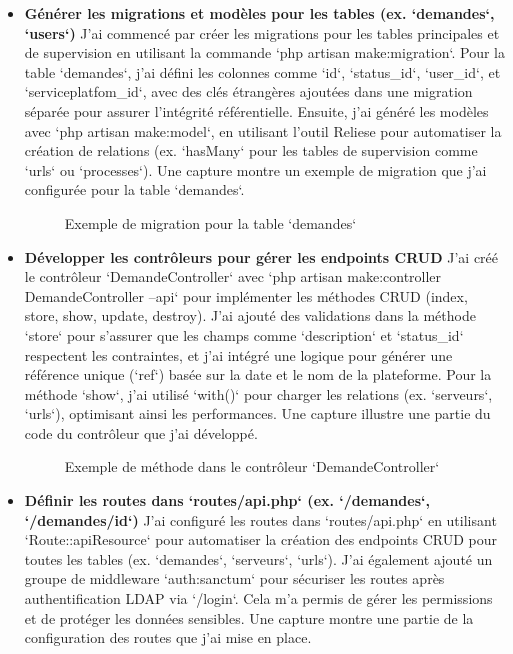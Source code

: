 \begin{itemize}
    \item \textbf{Générer les migrations et modèles pour les tables (ex. `demandes`, `users`)}  
      J’ai commencé par créer les migrations pour les tables principales et de supervision en utilisant la commande `php artisan make:migration`. Pour la table `demandes`, j’ai défini les colonnes comme `id`, `status\_id`, `user\_id`, et `serviceplatfom\_id`, avec des clés étrangères ajoutées dans une migration séparée pour assurer l’intégrité référentielle. Ensuite, j’ai généré les modèles avec `php artisan make:model`, en utilisant l’outil Reliese pour automatiser la création de relations (ex. `hasMany` pour les tables de supervision comme `urls` ou `processes`). Une capture montre un exemple de migration que j’ai configurée pour la table `demandes`.
      
      \begin{figure}[h]
          \centering
          \caption{Exemple de migration pour la table `demandes`}
          \label{fig:migration_demandes}
      \end{figure}
      
    \item \textbf{Développer les contrôleurs pour gérer les endpoints CRUD}  
      J’ai créé le contrôleur `DemandeController` avec `php artisan make:controller DemandeController --api` pour implémenter les méthodes CRUD (index, store, show, update, destroy). J’ai ajouté des validations dans la méthode `store` pour s’assurer que les champs comme `description` et `status\_id` respectent les contraintes, et j’ai intégré une logique pour générer une référence unique (`ref`) basée sur la date et le nom de la plateforme. Pour la méthode `show`, j’ai utilisé `with()` pour charger les relations (ex. `serveurs`, `urls`), optimisant ainsi les performances. Une capture illustre une partie du code du contrôleur que j’ai développé.
      
      \begin{figure}[h]
          \centering
          \caption{Exemple de méthode dans le contrôleur `DemandeController`}
          \label{fig:controller_demandes}
      \end{figure}
      
    \item \textbf{Définir les routes dans `routes/api.php` (ex. `/demandes`, `/demandes/{id}`)}  
      J’ai configuré les routes dans `routes/api.php` en utilisant `Route::apiResource` pour automatiser la création des endpoints CRUD pour toutes les tables (ex. `demandes`, `serveurs`, `urls`). J’ai également ajouté un groupe de middleware `auth:sanctum` pour sécuriser les routes après authentification LDAP via `/login`. Cela m’a permis de gérer les permissions et de protéger les données sensibles. Une capture montre une partie de la configuration des routes que j’ai mise en place.
      

\end{itemize}
